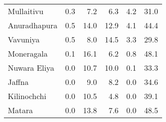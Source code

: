 \begin{tabular}{lrrrrr}
Mullaitivu   &         0.3 &         7.2 &          6.3 &              4.2 &        31.0 \\
Anuradhapura &         0.5 &        14.0 &         12.9 &              4.1 &        44.4 \\
Vavuniya     &         0.5 &         8.0 &         14.5 &              3.3 &        29.8 \\
Moneragala   &         0.1 &        16.1 &          6.2 &              0.8 &        48.1 \\
Nuwara Eliya &         0.0 &        10.7 &         10.0 &              0.1 &        33.3 \\
Jaffna       &         0.0 &         9.0 &          8.2 &              0.0 &        34.6 \\
Kilinochchi  &         0.0 &        10.5 &          4.8 &              0.0 &        39.1 \\
Matara       &         0.0 &        13.8 &          7.6 &              0.0 &        48.5 \\
\bottomrule
\end{tabular}
